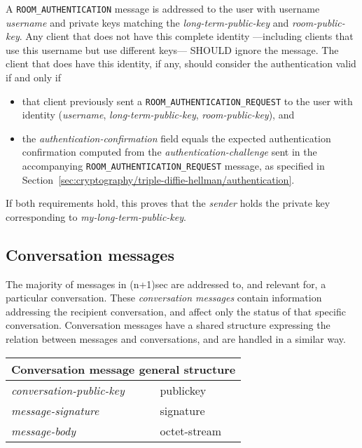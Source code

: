 \documentclass{article}
\def\message#1{\texttt{#1}}
\def\field#1{\textit{#1}}
\def\type#1{\textsf{#1}}
\begin{document}
A \message{ROOM\_AUTHENTICATION} message is addressed to the user with username \field{username} and private keys matching the \field{long-term-public-key} and \field{room-public-key}.
Any client that does not have this complete identity ---including clients that use this username but use different keys--- SHOULD ignore the message.
The client that does have this identity, if any, should consider the authentication valid if and only if
\begin{itemize}
\item that client previously sent a \message{ROOM\_AUTHENTICATION\_REQUEST} to the user with identity (\field{username}, \field{long-term-public-key}, \field{room-public-key}), and
\item the \field{authentication-confirmation} field equals the expected authentication confirmation computed from the \field{authentication-challenge} sent in the accompanying \message{ROOM\_AUTHENTICATION\_REQUEST} message, as specified in Section~\ref{sec:cryptography/triple-diffie-hellman/authentication}.
\end{itemize}
If both requirements hold, this proves that the \field{sender} holds the private key corresponding to \field{my-long-term-public-key}.


\subsection{Conversation messages}
\label{sec:messages/conversation-messages}

The majority of messages in (n+1)sec are addressed to, and relevant for, a particular conversation.
These \emph{conversation messages} contain information addressing the recipient conversation, and affect only the status of that specific conversation.
Conversation messages have a shared structure expressing the relation between messages and conversations, and are handled in a similar way.

\hspace{2em minus 2em}\begin{tabular}{|l|l|}
\hline
\multicolumn{2}{|c|}{Conversation message general structure} \\
\hline
\hline
\field{conversation-public-key} & \type{publickey} \\
\hline
\field{message-signature} & \type{signature} \\
\hline
\field{message-body} & \type{octet-stream} \\
\hline
\end{tabular}
\end{document}
